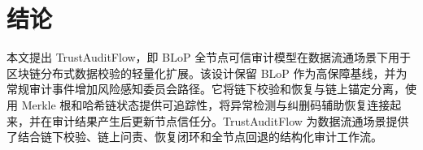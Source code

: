 \section{结论}

本文提出 TrustAuditFlow，即 BLoP 全节点可信审计模型在数据流通场景下用于区块链分布式数据校验的轻量化扩展。该设计保留 BLoP 作为高保障基线，并为常规审计事件增加风险感知委员会路径。它将链下校验和恢复与链上锚定分离，使用 Merkle 根和哈希链状态提供可追踪性，将异常检测与纠删码辅助恢复连接起来，并在审计结果产生后更新节点信任分。TrustAuditFlow 为数据流通场景提供了结合链下校验、链上问责、恢复闭环和全节点回退的结构化审计工作流。

